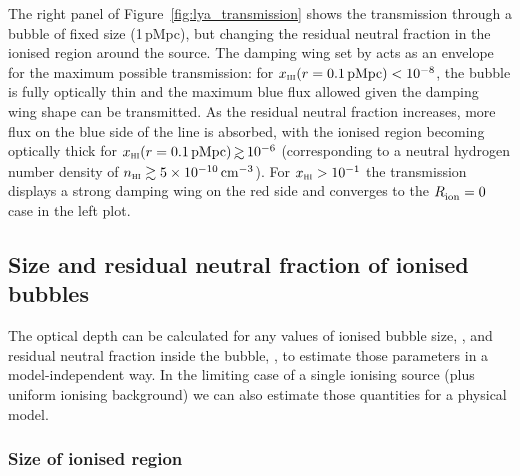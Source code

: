 \documentclass[fleqn,usenatbib]{mnras}
\begin{document}
The right panel of Figure~\ref{fig:lya_transmission} shows the transmission through a bubble of fixed size (1\,pMpc), but changing the residual neutral fraction in the ionised region around the source. The damping wing set by \Rion acts as an envelope for the maximum possible transmission: for $\xHI(r=0.1\,\mathrm{pMpc}) < 10^{-8}$, the bubble is fully optically thin and the maximum blue flux allowed given the damping wing shape can be transmitted. As the residual neutral fraction increases, more flux on the blue side of the line is absorbed, with the ionised region becoming optically thick for $\xHI(r=0.1\,\mathrm{pMpc}) \simgt 10^{-6}$ (corresponding to a neutral hydrogen number density of $n_\HI\gtrsim 5\times10^{-10}\cm^{-3}$). For $\xHI > 10^{-1}$ the transmission displays a strong damping wing on the red side and converges to the $\Rion=0$ case in the left plot.

\subsection{Size and residual neutral fraction of ionised bubbles}
\label{sec:model_HIIregion}

The optical depth can be calculated for any values of ionised bubble size, \Rion, and residual neutral fraction inside the bubble, \xHI, to estimate those parameters in a model-independent way. In the limiting case of a single ionising source (plus uniform ionising background) we can also estimate those quantities for a physical model.

\subsubsection{Size of ionised region}
\label{sec:model_HIIregion_R}
\end{document}
